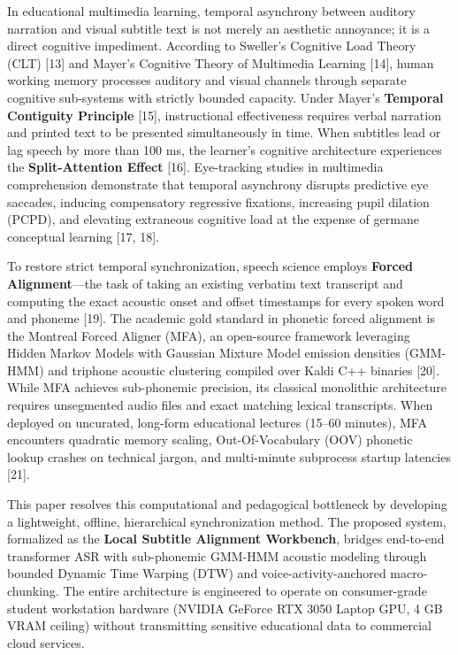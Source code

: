\documentclass[12pt,a4paper]{article}
\begin{document}
In educational multimedia learning, temporal asynchrony between auditory narration and visual subtitle text is not merely an aesthetic annoyance; it is a direct cognitive impediment. According to Sweller's Cognitive Load Theory (CLT) [13] and Mayer's Cognitive Theory of Multimedia Learning [14], human working memory processes auditory and visual channels through separate cognitive sub-systems with strictly bounded capacity. Under Mayer's \textbf{Temporal Contiguity Principle} [15], instructional effectiveness requires verbal narration and printed text to be presented simultaneously in time. When subtitles lead or lag speech by more than 100 ms, the learner's cognitive architecture experiences the \textbf{Split-Attention Effect} [16]. Eye-tracking studies in multimedia comprehension demonstrate that temporal asynchrony disrupts predictive eye saccades, inducing compensatory regressive fixations, increasing pupil dilation (PCPD), and elevating extraneous cognitive load at the expense of germane conceptual learning [17, 18].

To restore strict temporal synchronization, speech science employs \textbf{Forced Alignment}---the task of taking an existing verbatim text transcript and computing the exact acoustic onset and offset timestamps for every spoken word and phoneme [19]. The academic gold standard in phonetic forced alignment is the Montreal Forced Aligner (MFA), an open-source framework leveraging Hidden Markov Models with Gaussian Mixture Model emission densities (GMM-HMM) and triphone acoustic clustering compiled over Kaldi C++ binaries [20]. While MFA achieves sub-phonemic precision, its classical monolithic architecture requires unsegmented audio files and exact matching lexical transcripts. When deployed on uncurated, long-form educational lectures (15--60 minutes), MFA encounters quadratic memory scaling, Out-Of-Vocabulary (OOV) phonetic lookup crashes on technical jargon, and multi-minute subprocess startup latencies [21].

This paper resolves this computational and pedagogical bottleneck by developing a lightweight, offline, hierarchical synchronization method. The proposed system, formalized as the \textbf{Local Subtitle Alignment Workbench}, bridges end-to-end transformer ASR with sub-phonemic GMM-HMM acoustic modeling through bounded Dynamic Time Warping (DTW) and voice-activity-anchored macro-chunking. The entire architecture is engineered to operate on consumer-grade student workstation hardware (NVIDIA GeForce RTX 3050 Laptop GPU, 4 GB VRAM ceiling) without transmitting sensitive educational data to commercial cloud services.
\end{document}

